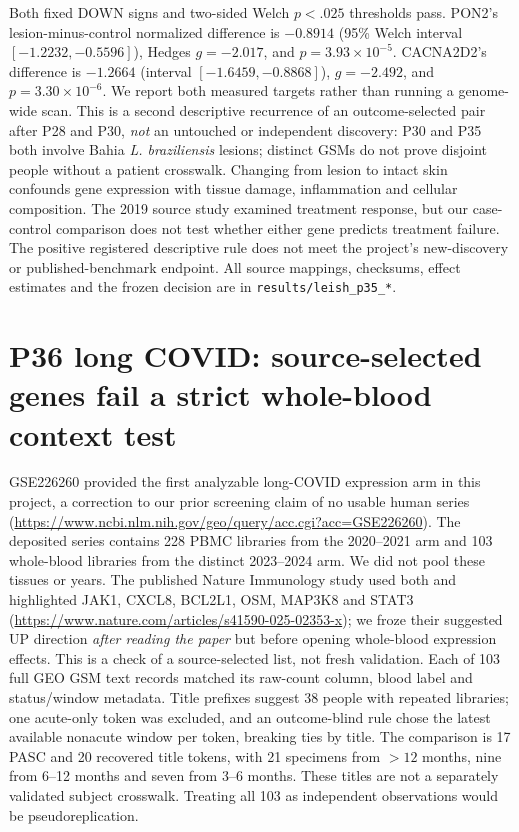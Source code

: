 \documentclass[11pt,a4paper]{article}
\begin{document}
Both fixed DOWN signs and two-sided Welch $p<.025$ thresholds pass. PON2's lesion-minus-control normalized difference is $-0.8914$ (95\% Welch interval $[-1.2232,-0.5596]$), Hedges $g=-2.017$, and $p=3.93\times10^{-5}$. CACNA2D2's difference is $-1.2664$ (interval $[-1.6459,-0.8868]$), $g=-2.492$, and $p=3.30\times10^{-6}$. We report both measured targets rather than running a genome-wide scan. This is a second descriptive recurrence of an outcome-selected pair after P28 and P30, \emph{not} an untouched or independent discovery: P30 and P35 both involve Bahia \emph{L. braziliensis} lesions; distinct GSMs do not prove disjoint people without a patient crosswalk. Changing from lesion to intact skin confounds gene expression with tissue damage, inflammation and cellular composition. The 2019 source study examined treatment response, but our case-control comparison does not test whether either gene predicts treatment failure. The positive registered descriptive rule does not meet the project's new-discovery or published-benchmark endpoint. All source mappings, checksums, effect estimates and the frozen decision are in \texttt{results/leish\_p35\_*}.

\section{P36 long COVID: source-selected genes fail a strict whole-blood context test}
GSE226260 provided the first analyzable long-COVID expression arm in this project, a correction to our prior screening claim of no usable human series (\url{https://www.ncbi.nlm.nih.gov/geo/query/acc.cgi?acc=GSE226260}). The deposited series contains 228 PBMC libraries from the 2020--2021 arm and 103 whole-blood libraries from the distinct 2023--2024 arm. We did not pool these tissues or years. The published Nature Immunology study used both and highlighted JAK1, CXCL8, BCL2L1, OSM, MAP3K8 and STAT3 (\url{https://www.nature.com/articles/s41590-025-02353-x}); we froze their suggested UP direction \emph{after reading the paper} but before opening whole-blood expression effects. This is a check of a source-selected list, not fresh validation. Each of 103 full GEO GSM text records matched its raw-count column, blood label and status/window metadata. Title prefixes suggest 38 people with repeated libraries; one acute-only token was excluded, and an outcome-blind rule chose the latest available nonacute window per token, breaking ties by title. The comparison is 17 PASC and 20 recovered title tokens, with 21 specimens from $>12$ months, nine from 6--12 months and seven from 3--6 months. These titles are not a separately validated subject crosswalk. Treating all 103 as independent observations would be pseudoreplication.
\end{document}
